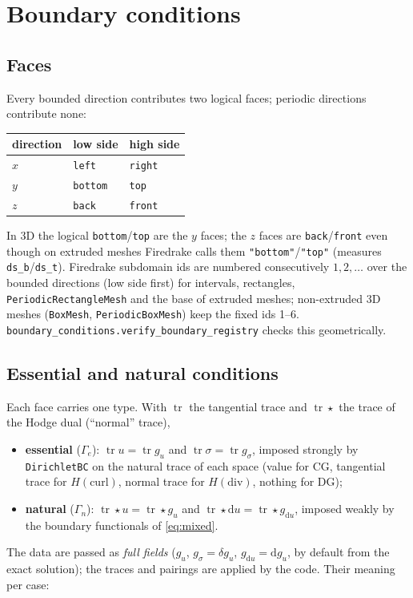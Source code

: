 \documentclass[11pt]{article}
\newcommand{\dd}{\mathrm{d}}
\newcommand{\cod}{\delta}
\newcommand{\tr}{\operatorname{tr}}
\newcommand{\hodge}{\star}
\newcommand{\code}[1]{\texttt{#1}}
\theoremstyle{remark}
\begin{document}
\section{Boundary conditions}\label{sec:bc}

\subsection{Faces}

Every bounded direction contributes two logical faces; periodic directions contribute none:

\begin{center}
\begin{tabular}{@{}lll@{}}
\toprule
direction & low side & high side\\
\midrule
$x$ & \code{left} & \code{right}\\
$y$ & \code{bottom} & \code{top}\\
$z$ & \code{back} & \code{front}\\
\bottomrule
\end{tabular}
\end{center}

In 3D the logical \code{bottom}/\code{top} are the $y$ faces; the $z$ faces are \code{back}/\code{front}
even though on extruded meshes Firedrake calls them \code{"bottom"}/\code{"top"} (measures
\code{ds\_b}/\code{ds\_t}). Firedrake subdomain ids are numbered consecutively $1,2,\dots$ over the
bounded directions (low side first) for intervals, rectangles, \code{PeriodicRectangleMesh} and the
base of extruded meshes; non-extruded 3D meshes (\code{BoxMesh}, \code{PeriodicBoxMesh}) keep the
fixed ids 1--6. \code{boundary\_conditions.verify\_boundary\_registry} checks this geometrically.

\subsection{Essential and natural conditions}

Each face carries one type. With $\tr$ the tangential trace and $\tr\hodge$ the trace of the Hodge
dual (``normal'' trace),
\begin{itemize}
\item \textbf{essential} ($\Gamma_e$): $\tr u = \tr g_u$ and $\tr\sigma=\tr g_\sigma$, imposed strongly by
  \code{DirichletBC} on the natural trace of each space (value for CG, tangential trace for
  $H(\mathrm{curl})$, normal trace for $H(\mathrm{div})$, nothing for DG);
\item \textbf{natural} ($\Gamma_n$): $\tr\hodge u=\tr\hodge g_u$ and $\tr\hodge\dd u = \tr\hodge g_{\dd u}$,
  imposed weakly by the boundary functionals of \eqref{eq:mixed}.
\end{itemize}
The data are passed as \emph{full fields} ($g_u$, $g_\sigma=\cod g_u$, $g_{\dd u}=\dd g_u$, by default
from the exact solution); the traces and pairings are applied by the code. Their meaning per case:
\end{document}
